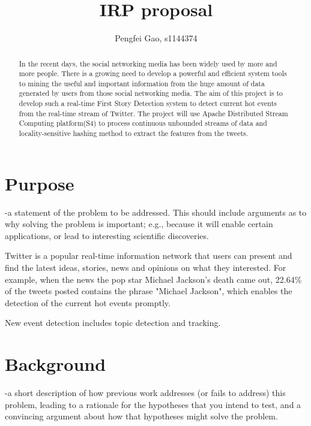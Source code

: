 \documentclass[a4paper,12pt]{article}
\title{IRP proposal}
\author{Pengfei Gao, s1144374}
\begin{document}
\maketitle

\begin{abstract}

In the recent days, the social networking media has been widely used by more and more people. There is a growing need to develop a powerful and efficient system tools to mining the useful and important information from the huge amount of data generated by users from those social networking media. The aim of this project is to develop such a real-time First Story Detection system to detect current hot events from the real-time stream of Twitter. The project will use Apache Distributed Stream Computing platform(S4) to process continuous unbounded streams of data and locality-sensitive hashing method to extract the features from the tweets.

\end{abstract}



\section{Purpose}

-a statement of the problem to be addressed. This should include arguments as to why solving the problem is important; e.g., because it will enable certain applications, or lead to interesting scientific discoveries.


Twitter is a popular real-time information network that users can present and find the latest ideas, stories, news and opinions on what they interested. For example, when the news the pop star Michael Jackson's death came out, 22.64\% of the tweets posted contains the phrase "Michael Jackson", which enables the detection of the current hot events promptly. 


New event detection includes topic detection and tracking. 








\section{Background}

-a short description of how previous work addresses (or fails to address) this problem, leading to a rationale for the hypotheses that you intend to test, and a convincing argument about how that hypotheses might solve the problem.
\end{document}
